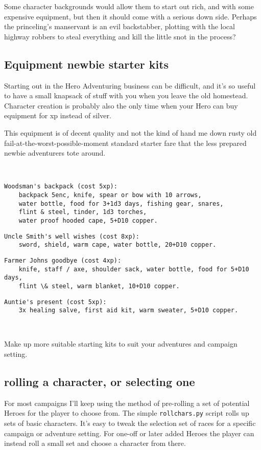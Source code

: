 Some character backgrounds would allow them to start out rich, and with some expensive equipment, but then it should come with a serious down side. Perhaps the princeling's manservant is an evil backstabber, plotting with the local highway robbers to steal everything and kill the little snot in the process?


\subsection*{Equipment newbie starter kits}
Starting out in the Hero Adventuring business can be difficult, and it's so useful to have a small knapsack of stuff with you when you leave the old homestead. Character creation is probably also the only time when your Hero can buy equipment for xp instead of silver.

This equipment is of decent quality and not the kind of hand me down rusty old fail-at-the-worst-possible-moment standard starter fare that the less prepared newbie adventurers tote around.

\

\goodbreak \small \begin{samepage} \begin{verbatim}
Woodsman's backpack (cost 5xp):
    backpack 5enc, knife, spear or bow with 10 arrows,
    water bottle, food for 3+1d3 days, fishing gear, snares,
    flint & steel, tinder, 1d3 torches,
    water proof hooded cape, 5+D10 copper.
\end{verbatim}\goodbreak\begin{verbatim}
Uncle Smith's well wishes (cost 8xp):
    sword, shield, warm cape, water bottle, 20+D10 copper.
\end{verbatim}\goodbreak\begin{verbatim}
Farmer Johns goodbye (cost 4xp):
    knife, staff / axe, shoulder sack, water bottle, food for 5+D10 days,
    flint \& steel, warm blanket, 10+D10 copper.
\end{verbatim}\goodbreak\begin{verbatim}
Auntie's present (cost 5xp):
    3x healing salve, first aid kit, warm sweater, 5+D10 copper.
\end{verbatim} \end{samepage} \normalsize

\

\noindent Make up more suitable starting kits to suit your adventures and campaign setting.


\subsection*{rolling a character, or selecting one}
For most campaigns I'll keep using the method of pre-rolling a set of potential Heroes for the player to choose from. The simple \verb|rollchars.py| script rolls up sets of basic characters. It's easy to tweak the selection set of races for a specific campaign or adventure setting.
For one-off or later added Heroes the player can instead roll a small set and choose a character from there.


